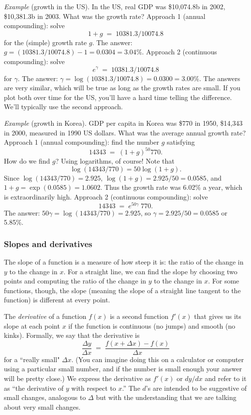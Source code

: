 \documentclass[letterpaper,12pt]{article}
\begin{document}
{\it Example} (growth in the US).
In the US, real GDP was \$10,074.8b in 2002, \$10,381.3b in 2003.
What was the growth rate?
Approach 1 (annual compounding):
solve
\[
    1 + g \;=\; 10381.3/10074.8
\]
for the (simple) growth rate $g$.
The answer:  $g = (10381.3/10074.8) - 1  = 0.0304 = 3.04\%$.
Approach 2 (continuous compounding):
solve
\[
    e^{\gamma} \;=\; 10381.3/10074.8
\]
for $\gamma$.
The answer:  $\gamma = \log (10381.3/10074.8) = 0.0300 = 3.00\%$.
The answers are very similar, which will be true as long
as the growth rates are small.
If you plot both over time for the US,
you'll have a hard time telling the difference.
We'll typically use the second approach.


{\it Example} (growth in Korea).
GDP per capita in Korea was \$770 in 1950, \$14,343 in 2000,
measured in 1990 US dollars.
What was the average annual growth rate?
Approach 1 (annual compounding):
find the number $g$ satisfying
\[
    14343 \;=\; (1+g)^{50} 770.
\]
How do we find $g$?
Using logarithms, of course!  Note that
\[
    \log (14343/770)  = 50 \log (1+g).
\]
Since $\log (14343/770) = 2.925$, $\log (1+g) = 2.925/50  = 0.0585$,
and $1+g = \exp(0.0585) = 1.0602$.
Thus the growth rate was 6.02\% a year,
which is extraordinarily high.
Approach 2 (continuous compounding):
solve
\[
    14343 \;=\; e^{50 \gamma} \; 770.
\]
The answer:  $ 50 \gamma = \log (14343/770) = 2.925 $,
so $\gamma = 2.925/50 = 0.0585 $ or 5.85\%.



\subsubsection*{Slopes and derivatives}

The slope of a function is a measure of how steep it is: the ratio
of the change in $y$ to the change in $x$. For a straight line, we
can find the slope by choosing two points and computing the ratio
of the change in $y$ to the change in $x$. For some functions,
though, the slope (meaning the slope of a straight line tangent to
the function) is different at every point.


The {\it derivative\/} of a function $f(x)$
is a second function  $f'(x)$ that gives us its slope at each point $x$
if the function is continuous (no jumps) and smooth (no kinks).
Formally, we say that the derivative is
\[
  \frac{\Delta y}{\Delta x} \;=\; \frac{f(x+\Delta x) - f(x)}{\Delta x}
\]
for  a ``really small" $\Delta x$. (You can imagine doing this on
a calculator or computer using a particular small number, and if
the number is small enough your answer will be pretty close.) We
express the derivative as $f'(x)$ or $dy/dx$ and refer to it as
``the derivative of $y$ with respect to $x$.'' The $d$'s are
intended to be suggestive of small changes, analogous to $\Delta$
but with the understanding that we are talking about very small
changes.
\end{document}

